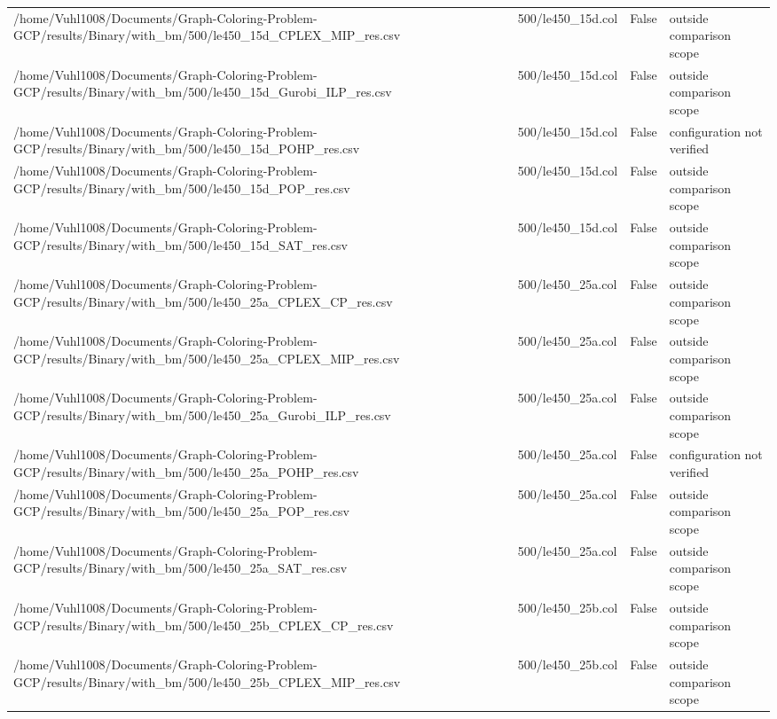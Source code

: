 \begin{table}[htbp]
\begin{tabular}{llll}
/home/Vuhl1008/Documents/Graph-Coloring-Problem-GCP/results/Binary/with\_bm/500/le450\_15d\_CPLEX\_MIP\_res.csv & 500/le450\_15d.col & False & outside comparison scope \\
/home/Vuhl1008/Documents/Graph-Coloring-Problem-GCP/results/Binary/with\_bm/500/le450\_15d\_Gurobi\_ILP\_res.csv & 500/le450\_15d.col & False & outside comparison scope \\
/home/Vuhl1008/Documents/Graph-Coloring-Problem-GCP/results/Binary/with\_bm/500/le450\_15d\_POHP\_res.csv & 500/le450\_15d.col & False & configuration not verified \\
/home/Vuhl1008/Documents/Graph-Coloring-Problem-GCP/results/Binary/with\_bm/500/le450\_15d\_POP\_res.csv & 500/le450\_15d.col & False & outside comparison scope \\
/home/Vuhl1008/Documents/Graph-Coloring-Problem-GCP/results/Binary/with\_bm/500/le450\_15d\_SAT\_res.csv & 500/le450\_15d.col & False & outside comparison scope \\
/home/Vuhl1008/Documents/Graph-Coloring-Problem-GCP/results/Binary/with\_bm/500/le450\_25a\_CPLEX\_CP\_res.csv & 500/le450\_25a.col & False & outside comparison scope \\
/home/Vuhl1008/Documents/Graph-Coloring-Problem-GCP/results/Binary/with\_bm/500/le450\_25a\_CPLEX\_MIP\_res.csv & 500/le450\_25a.col & False & outside comparison scope \\
/home/Vuhl1008/Documents/Graph-Coloring-Problem-GCP/results/Binary/with\_bm/500/le450\_25a\_Gurobi\_ILP\_res.csv & 500/le450\_25a.col & False & outside comparison scope \\
/home/Vuhl1008/Documents/Graph-Coloring-Problem-GCP/results/Binary/with\_bm/500/le450\_25a\_POHP\_res.csv & 500/le450\_25a.col & False & configuration not verified \\
/home/Vuhl1008/Documents/Graph-Coloring-Problem-GCP/results/Binary/with\_bm/500/le450\_25a\_POP\_res.csv & 500/le450\_25a.col & False & outside comparison scope \\
/home/Vuhl1008/Documents/Graph-Coloring-Problem-GCP/results/Binary/with\_bm/500/le450\_25a\_SAT\_res.csv & 500/le450\_25a.col & False & outside comparison scope \\
/home/Vuhl1008/Documents/Graph-Coloring-Problem-GCP/results/Binary/with\_bm/500/le450\_25b\_CPLEX\_CP\_res.csv & 500/le450\_25b.col & False & outside comparison scope \\
/home/Vuhl1008/Documents/Graph-Coloring-Problem-GCP/results/Binary/with\_bm/500/le450\_25b\_CPLEX\_MIP\_res.csv & 500/le450\_25b.col & False & outside comparison scope \\

\end{tabular}
\end{table}
